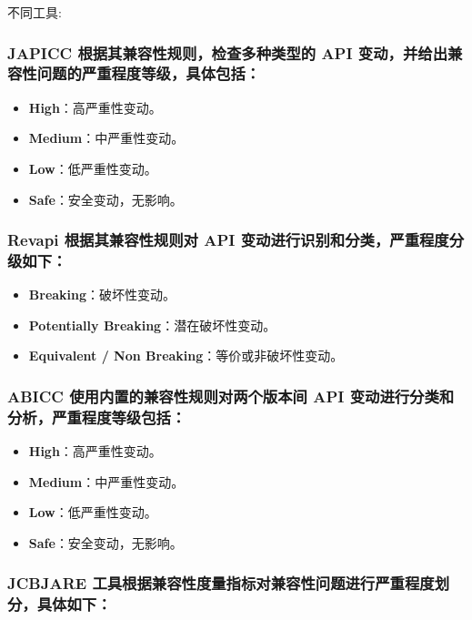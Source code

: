 \documentclass[14pt,a4paper,UTF8,twoside]{article}
\renewenvironment{proof}[1][不同工具:]{\ProofBox\strut\textsc{#1}\space}{\endProofBox}
\begin{document}
\begin{proof}{}{}

\subsubsection*{JAPICC 根据其兼容性规则，检查多种类型的 API 变动，并给出兼容性问题的严重程度等级，具体包括：}

\begin{itemize}
    \item \textbf{High}：高严重性变动。  
    \item \textbf{Medium}：中严重性变动。  
    \item \textbf{Low}：低严重性变动。  
    \item \textbf{Safe}：安全变动，无影响。  
\end{itemize}

\subsubsection*{Revapi 根据其兼容性规则对 API 变动进行识别和分类，严重程度分级如下：}

\begin{itemize}
    \item \textbf{Breaking}：破坏性变动。  
    \item \textbf{Potentially Breaking}：潜在破坏性变动。  
    \item \textbf{Equivalent / Non Breaking}：等价或非破坏性变动。  
\end{itemize}

\subsubsection*{ABICC 使用内置的兼容性规则对两个版本间 API 变动进行分类和分析，严重程度等级包括：} 

\begin{itemize}
    \item \textbf{High}：高严重性变动。  
    \item \textbf{Medium}：中严重性变动。  
    \item \textbf{Low}：低严重性变动。  
    \item \textbf{Safe}：安全变动，无影响。  
\end{itemize}

\subsubsection*{JCBJARE 工具根据兼容性度量指标对兼容性问题进行严重程度划分，具体如下： }


\end{proof}
\end{document}
